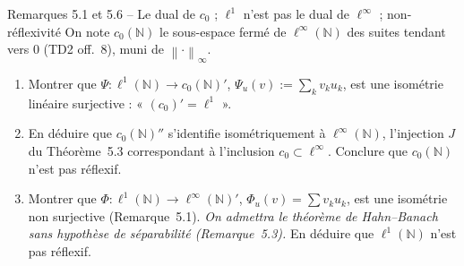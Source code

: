 \documentclass[11pt,a4paper]{article}
\newcommand{\N}{\mathbb{N}}
\newcommand{\norm}[1]{\left\|#1\right\|}
\theoremstyle{definition}
\begin{document}
\begin{exo}{Remarques 5.1 et 5.6 -- Le dual de $c_0$ ; $\ell^1$ n'est pas le dual de $\ell^\infty$ ; non-réflexivité}
On note $c_0(\N)$ le sous-espace fermé de $\ell^\infty(\N)$ des suites tendant vers $0$ (TD2 off.~8), muni de $\norm\cdot_\infty$.
\begin{enumerate}[label=(\alph*)]
  \item Montrer que $\Psi:\ell^1(\N)\to c_0(\N)'$, $\Psi_u(v):=\sum_kv_ku_k$, est une isométrie linéaire surjective : « $(c_0)'=\ell^1$ ».
  \item En déduire que $c_0(\N)''$ s'identifie isométriquement à $\ell^\infty(\N)$, l'injection $J$ du Théorème~5.3 correspondant à l'inclusion $c_0\subset\ell^\infty$. Conclure que $c_0(\N)$ n'est pas réflexif.
  \item Montrer que $\Phi:\ell^1(\N)\to\ell^\infty(\N)'$, $\Phi_u(v)=\sum v_ku_k$, est une isométrie non surjective (Remarque~5.1). \emph{On admettra le théorème de Hahn--Banach sans hypothèse de séparabilité (Remarque~5.3).} En déduire que $\ell^1(\N)$ n'est pas réflexif.
\end{enumerate}
\end{exo}
\end{document}
